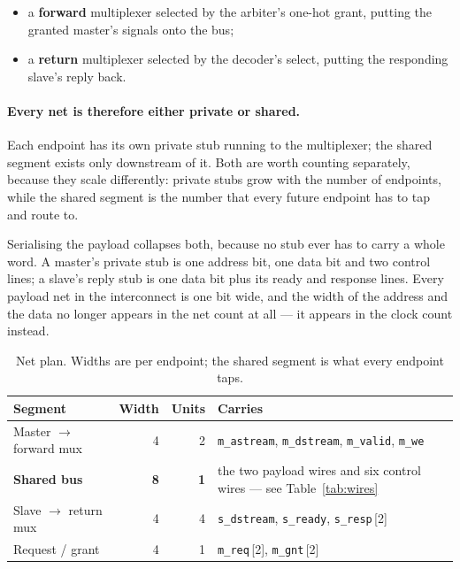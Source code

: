 \documentclass[11pt,a4paper]{article}
\newcommand{\sig}[1]{\texttt{#1}}
\begin{document}
\begin{itemize}[leftmargin=1.4em,itemsep=1pt]
\item a \textbf{forward} multiplexer selected by the arbiter's one-hot grant,
      putting the granted master's signals onto the bus;
\item a \textbf{return} multiplexer selected by the decoder's select, putting
      the responding slave's reply back.
\end{itemize}

\paragraph{Every net is therefore either private or shared.}
Each endpoint has its own private stub running to the multiplexer; the shared
segment exists only downstream of it. Both are worth counting separately,
because they scale differently: private stubs grow with the number of
endpoints, while the shared segment is the number that every future endpoint
has to tap and route to.

Serialising the payload collapses both, because no stub ever has to carry a
whole word. A master's private stub is one address bit, one data bit and two
control lines; a slave's reply stub is one data bit plus its ready and
response lines. Every payload net in the interconnect is one bit wide, and
the width of the address and the data no longer appears in the net count at
all --- it appears in the clock count instead.

\begin{table}[htb]
\centering\small
\caption{Net plan. Widths are per endpoint; the shared segment is what every
endpoint taps.}
\begin{tabularx}{\textwidth}{@{}lrrX@{}}
\toprule
\textbf{Segment} & \textbf{Width} & \textbf{Units} & \textbf{Carries}\\
\midrule
Master $\rightarrow$ forward mux & 4 & 2 &
  \sig{m\_astream}, \sig{m\_dstream}, \sig{m\_valid}, \sig{m\_we}\\
\addlinespace
\textbf{Shared bus} & \textbf{8} & \textbf{1} &
  the two payload wires and six control wires --- see
  Table~\ref{tab:wires}\\
\addlinespace
Slave $\rightarrow$ return mux & 4 & 4 &
  \sig{s\_dstream}, \sig{s\_ready}, \sig{s\_resp}\,[2]\\
\addlinespace
Request / grant & 4 & 1 &
  \sig{m\_req}\,[2], \sig{m\_gnt}\,[2]\\
\bottomrule
\end{tabularx}
\end{table}
\end{document}

